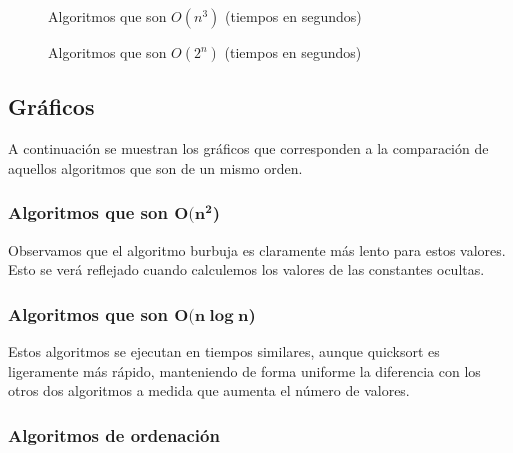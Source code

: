 \documentclass[11pt]{article}
\begin{document}
\begin{figure}[H]
	\centering
	\caption*{Algoritmos que son $O(n^3)$ (tiempos en segundos)}
	\pgfplotstabletypeset[columns={0, Floyd}]{\floydlinuxOCero}
\end{figure}


\begin{figure}[H]
	\centering
	\caption*{Algoritmos que son $O(2^n)$ (tiempos en segundos)}
	\pgfplotstabletypeset[columns={0, Hanoi}]{\hanoilinuxOCero}
\end{figure}


    
\subsection*{Gráficos}

A continuación se muestran los gráficos que corresponden a la comparación de aquellos algoritmos que son de un mismo orden.

\subsubsection*{Algoritmos que son $\boldsymbol{O(n^2}$)}

\begin{center}
	
\end{center}

Observamos que el algoritmo burbuja es claramente más lento para estos valores. Esto se verá reflejado cuando calculemos los valores de las constantes ocultas.


\subsubsection*{Algoritmos que son $\boldsymbol{O(n\log n}$)}

\begin{center}
	
\end{center}

Estos algoritmos se ejecutan en tiempos similares, aunque quicksort es ligeramente más rápido, manteniendo de forma uniforme la diferencia con los otros dos algoritmos a medida que aumenta el número de valores.

\subsubsection*{Algoritmos de ordenación}

\begin{adjustbox}{center}
	
\end{adjustbox}
\end{document}
